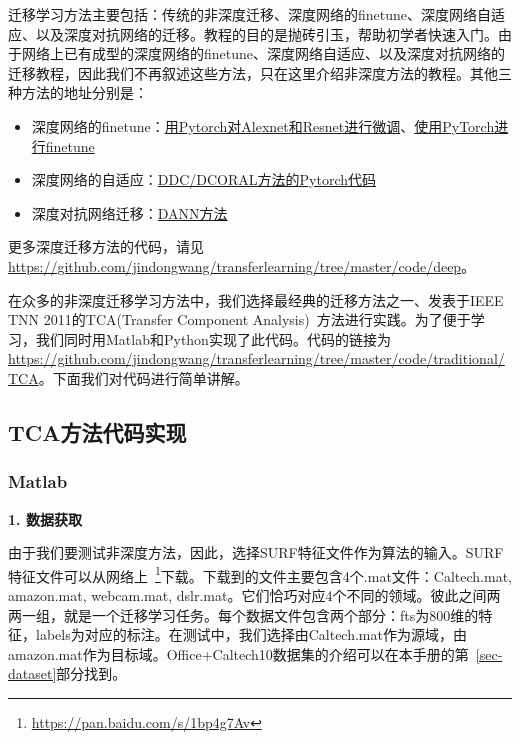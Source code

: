 迁移学习方法主要包括：传统的非深度迁移、深度网络的finetune、深度网络自适应、以及深度对抗网络的迁移。教程的目的是抛砖引玉，帮助初学者快速入门。由于网络上已有成型的深度网络的finetune、深度网络自适应、以及深度对抗网络的迁移教程，因此我们不再叙述这些方法，只在这里介绍非深度方法的教程。其他三种方法的地址分别是：

\begin{itemize}
	\item 深度网络的finetune：\href{https://github.com/jindongwang/transferlearning/tree/master/code/deep/finetune_AlexNet_ResNet}{用Pytorch对Alexnet和Resnet进行微调}、\href{https://pytorch.org/tutorials/beginner/transfer_learning_tutorial.html}{使用PyTorch进行finetune}
	\item 深度网络的自适应：\href{https://github.com/jindongwang/transferlearning/tree/master/code/deep/DDC_DeepCoral}{DDC/DCORAL方法的Pytorch代码}
	\item 深度对抗网络迁移：\href{https://github.com/jindongwang/transferlearning/tree/master/code/deep/DANN(RevGrad)}{DANN方法}
\end{itemize}

更多深度迁移方法的代码，请见\url{https://github.com/jindongwang/transferlearning/tree/master/code/deep}。


在众多的非深度迁移学习方法中，我们选择最经典的迁移方法之一、发表于IEEE TNN 2011的TCA(Transfer Component Analysis)~\cite{pan2011domain}方法进行实践。为了便于学习，我们同时用Matlab和Python实现了此代码。代码的链接为\url{https://github.com/jindongwang/transferlearning/tree/master/code/traditional/TCA}。下面我们对代码进行简单讲解。

\subsection{TCA方法代码实现}

\subsubsection{Matlab}

\textbf{1. 数据获取}

由于我们要测试非深度方法，因此，选择SURF特征文件作为算法的输入。SURF特征文件可以从网络上~\footnote{\url{https://pan.baidu.com/s/1bp4g7Av}}下载。下载到的文件主要包含4个.mat文件：Caltech.mat, amazon.mat, webcam.mat, dslr.mat。它们恰巧对应4个不同的领域。彼此之间两两一组，就是一个迁移学习任务。每个数据文件包含两个部分：fts为800维的特征，labels为对应的标注。在测试中，我们选择由Caltech.mat作为源域，由amazon.mat作为目标域。Office+Caltech10数据集的介绍可以在本手册的第~\ref{sec-dataset}部分找到。

